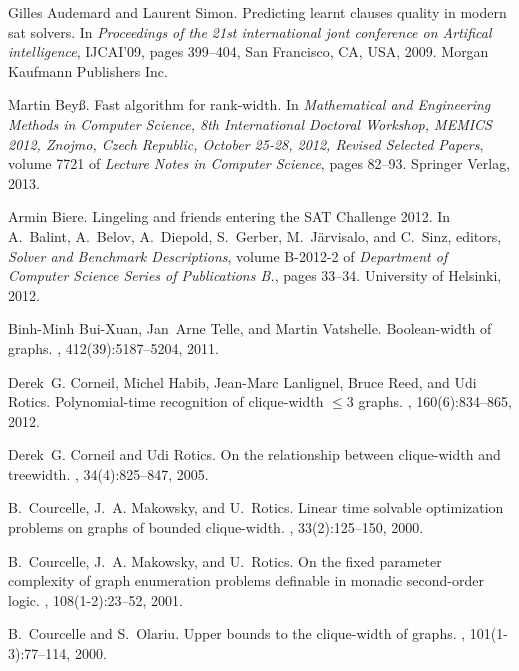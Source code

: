 \documentclass[10pt,usletter]{article}
\theoremstyle{remark}
\begin{document}
\begin{thebibliography}{10}

Gilles Audemard and Laurent Simon.
\newblock Predicting learnt clauses quality in modern sat solvers.
\newblock In {\em Proceedings of the 21st international jont conference on
  Artifical intelligence}, IJCAI'09, pages 399--404, San Francisco, CA, USA,
  2009. Morgan Kaufmann Publishers Inc.

Martin Bey\ss.
\newblock Fast algorithm for rank-width.
\newblock In {\em Mathematical and Engineering Methods in Computer Science, 8th
  International Doctoral Workshop, MEMICS 2012, Znojmo, Czech Republic, October
  25-28, 2012, Revised Selected Papers}, volume 7721 of {\em Lecture Notes in
  Computer Science}, pages 82--93. Springer Verlag, 2013.

Armin Biere.
\newblock Lingeling and friends entering the {SAT} {Challenge} 2012.
\newblock In A.~Balint, A.~Belov, A.~Diepold, S.~Gerber, M.~J\"{a}rvisalo, and
  C.~Sinz, editors, {\em Solver and Benchmark Descriptions}, volume B-2012-2 of
  {\em Department of Computer Science Series of Publications B.}, pages 33--34.
  University of Helsinki, 2012.

Binh-Minh Bui-Xuan, Jan~Arne Telle, and Martin Vatshelle.
\newblock Boolean-width of graphs.
, 412(39):5187--5204, 2011.

Derek~G. Corneil, Michel Habib, Jean-Marc Lanlignel, Bruce Reed, and Udi
  Rotics.
\newblock Polynomial-time recognition of clique-width {$\leq 3$} graphs.
, 160(6):834--865, 2012.

Derek~G. Corneil and Udi Rotics.
\newblock On the relationship between clique-width and treewidth.
, 34(4):825--847, 2005.

B.~Courcelle, J.~A. Makowsky, and U.~Rotics.
\newblock Linear time solvable optimization problems on graphs of bounded
  clique-width.
, 33(2):125--150, 2000.

B.~Courcelle, J.~A. Makowsky, and U.~Rotics.
\newblock On the fixed parameter complexity of graph enumeration problems
  definable in monadic second-order logic.
, 108(1-2):23--52, 2001.

B.~Courcelle and S.~Olariu.
\newblock Upper bounds to the clique-width of graphs.
, 101(1-3):77--114, 2000.


\end{thebibliography}
\end{document}
